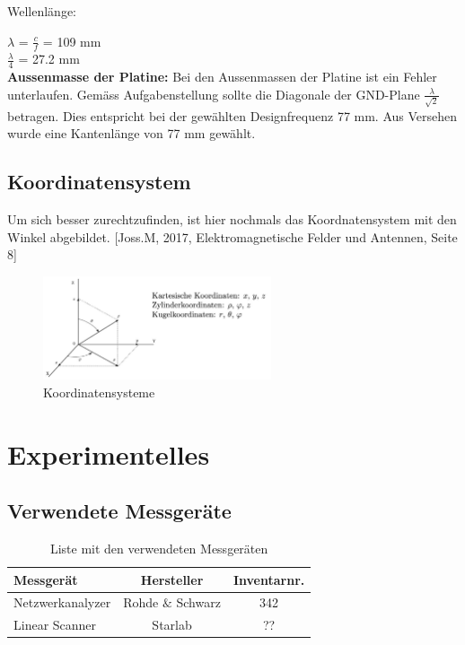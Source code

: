 Wellenlänge:

\vspace{3mm}
$\lambda$ = $\frac{c}{f}$ = 109 mm\\
$\frac{\lambda}{4}$ = 27.2 mm\\

\textbf{Aussenmasse der Platine:} Bei den Aussenmassen der Platine ist ein Fehler unterlaufen. Gemäss Aufgabenstellung sollte die Diagonale der GND-Plane $\frac{\lambda}{\sqrt{2}}$ betragen. Dies entspricht bei der gewählten Designfrequenz 77 mm. Aus Versehen wurde eine Kantenlänge von 77 mm gewählt.\\

\subsection{Koordinatensystem}
Um sich besser zurechtzufinden, ist hier nochmals das Koordnatensystem mit den Winkel abgebildet. [Joss.M, 2017, Elektromagnetische Felder und Antennen, Seite 8]

\begin{figure}[htbp]
	\centering
	\includegraphics[width=0.6\textwidth]{pic/Koordinatensysteme.JPG}
	\caption{Koordinatensysteme}
	\label{fig:Koordinatensysteme}
\end{figure}

\newpage

\section{Experimentelles}

\subsection{Verwendete Messgeräte}
\begin{table}[h] 
	\centering
	\begin{tabular}{l|c|c}
		Messgerät & Hersteller & Inventarnr.\\
		\hline\hline
		Netzwerkanalyzer & Rohde $\&$ Schwarz & 342  \\
		Linear Scanner & Starlab & ??  \\
	
	\end{tabular}
	\caption{Liste mit den verwendeten Messgeräten}
	\label{ListeMessgeraete}
\end{table}

